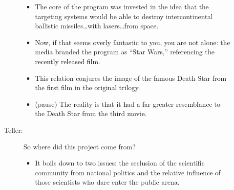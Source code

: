\documentclass[12pt]{article}
\begin{document}
\begin{description}
\begin{description}
\begin{itemize}
          \item The core of the program was invested in the idea that the
            targeting systems would be able to destroy intercontinental
            ballistic missiles\ldots with lasers\ldots from space.

          \item Now, if that seems overly fantastic to you, you are not alone:
            the media branded the program as ``Star Wars,'' referencing the
            recently released film.

          \item This relation conjures the image of the famous Death Star from
            the first film in the original trilogy.

          \item (pause) The reality is that it had a far greater resemblance to
            the Death Star from the third movie.
        

        \end{itemize}

      \item[Teller:] So where did this project come from?
        \begin{itemize}

          \item It boils down to two issues: the seclusion of the scientific
            community from national politics and the relative influence of
            those scientists who dare enter the public arena.


\end{itemize}
\end{description}
\end{description}
\end{document}
